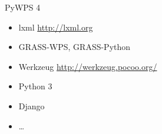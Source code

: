 \documentclass[xcolor=dvipsnames]{beamer}
\begin{document}
\begin{frame}{PyWPS 4}
    \begin{center}
    \end{center}
\end{frame}

\begin{frame}
    \begin{itemize}
        \item lxml \url{http://lxml.org}
        \item GRASS-WPS, GRASS-Python
        \item Werkzeug \url{http://werkzeug.pocoo.org/}
        \item Python 3
        \item Django
        \item \dots
    \end{itemize}
\end{frame}
\end{document}
